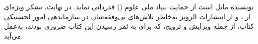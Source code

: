 نویسنده مایل است از حمایت بنیاد ملی علوم () قدردانی نماید. در نهایت، تشکر ویژه‌ای از ،  و  از انتشارات الزویر به‌خاطر تلاش‌های بی‌وقفه‌شان در سازماندهی امور لجستیکی کتاب، از جمله ویرایش و ترویج، که برای به ثمر رسیدن این کتاب ضروری بودند، به‌عمل می‌آید.









